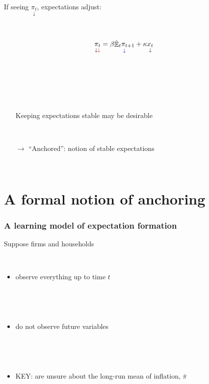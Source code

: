 \documentclass{beamer}
\DeclareMathOperator{\E}{\mathbb{E}}
\begin{document}
\begin{frame}
	\frametitle{}

If seeing $\underset{\downarrow}{\pi_t}$, expectations adjust:

\

\begin{align*}
\underset{\downarrow \color{red}{\downarrow}}{\pi_t} & = \beta \underset{\color{blue}{\downarrow}}{\hat{\E}_t\pi_{t+1}}+ \kappa \underset{\downarrow}{x_t} 
\end{align*}

\

\

\

\begin{itemize}
\item[] Keeping expectations stable may be desirable

\

\item[$\rightarrow$]  ``Anchored'': notion of stable expectations
\end{itemize}

\


\end{frame}

\section{A formal notion of anchoring}
\begin{frame}
	\frametitle{A learning model of expectation formation}
Suppose firms and households

\

\begin{itemize}
\item observe everything up to time $t$ 

\

\

\item do not observe future variables

\

\

\item KEY: are unsure about the long-run mean of inflation, $\bar{\pi}$
\end{itemize}


\



\end{frame}
\end{document}
